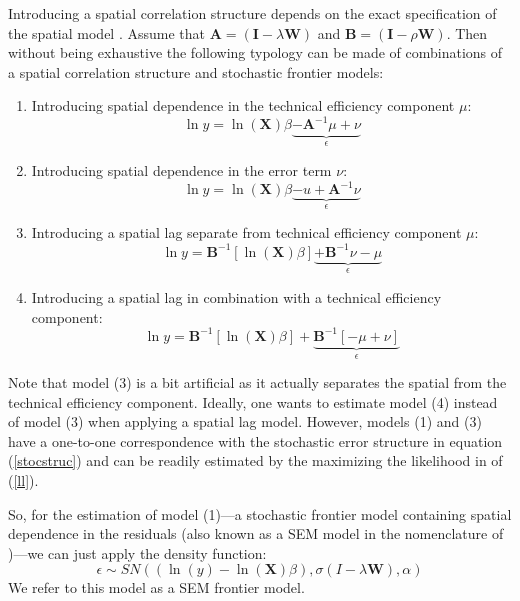 \documentclass[11pt,parskip,abstracton,notitlepage]{scrartcl}
\begin{document}
Introducing a spatial correlation structure depends on the exact specification of the spatial model  \citep[see for further elaboration][]{Anselin1988}. Assume that $\mathbf{A} = \left(\mathbf{I} - \lambda\mathbf{W}\right)$ and $\mathbf{B} = \left(\mathbf{I} - \rho\mathbf{W}\right)$. Then without being exhaustive the following typology can be made of combinations of a spatial correlation structure and stochastic frontier models:

	\begin{enumerate}
	\item Introducing spatial dependence in the technical efficiency component $\mu$:
	\begin{equation*}					
	\ln y = \ln(\mathbf{X}) \beta \underbrace{- \mathbf{A}^{-1}\mu + \nu}_\epsilon
	\end{equation*}
	\item Introducing spatial dependence in the error term $\nu$:
	\begin{equation*}					
	\ln y = \ln(\mathbf{X}) \beta \underbrace{- u +  \mathbf{A}^{-1}\nu}_\epsilon
	\end{equation*}
	\item Introducing a spatial lag separate from technical efficiency component $\mu$:
	\begin{equation*}					
	\ln y =  \mathbf{B}^{-1}\left[\ln(\mathbf{X}) \beta\right] \underbrace{+ \mathbf{B}^{-1}\nu - \mu}_{\epsilon}
	\end{equation*}
	\item Introducing a spatial lag in combination with a technical efficiency component:
	\begin{equation*}					
	\ln y = \mathbf{B}^{-1}\left[\ln(\mathbf{X}) \beta \right]+  \underbrace{\mathbf{B}^{-1}\left[- \mu + \nu\right]}_\epsilon
	\end{equation*}
\end{enumerate}
Note that model (3) is a bit artificial as it actually separates the spatial from the technical efficiency component. Ideally, one wants to estimate model (4) instead of model (3) when applying a spatial lag model. However, models (1) and (3) have a one-to-one correspondence with the stochastic error structure in equation (\ref{stocstruc}) and can be readily estimated by the maximizing the likelihood in of (\ref{ll}).

So, for the estimation of model (1)---a stochastic frontier model containing spatial dependence in the residuals (also known as a SEM model in the nomenclature of \citet{LESAGE2009})---we can just apply the density function:
$$\epsilon  \sim SN( \left(\ln \left(y\right) - \ln \left(\mathbf{X}\right) \beta \right), \sigma \left(I - \lambda \mathbf{W}\right), \alpha)$$ 
We refer to this model as a SEM frontier model.
\end{document}

